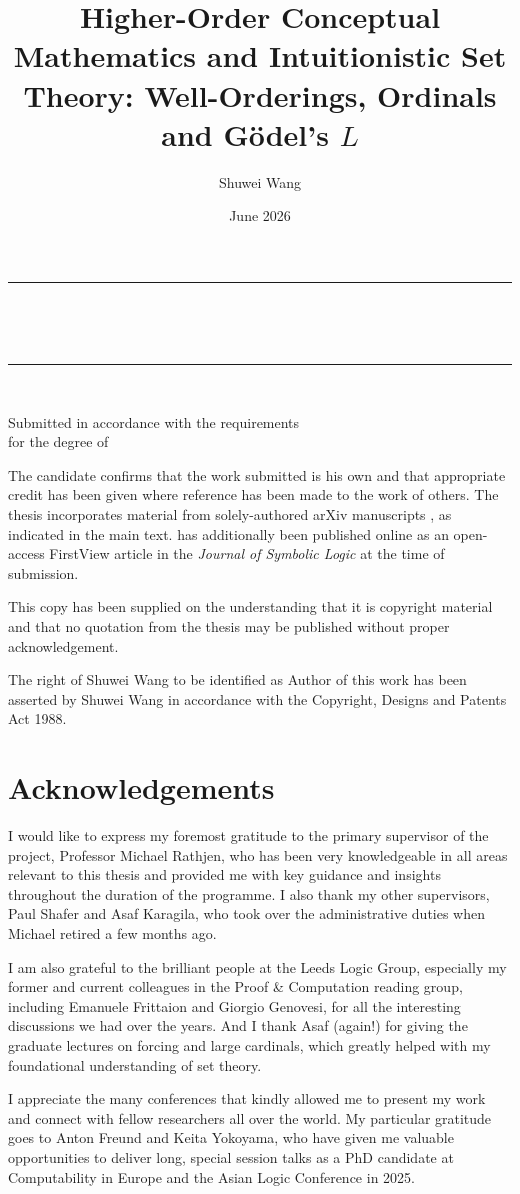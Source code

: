 \documentclass[12pt,openany]{book}
\title{Higher-Order Conceptual Mathematics and Intuitionistic Set Theory: Well-Orderings, Ordinals and G\"odel's $L$}
\author{Shuwei Wang}
\date{June 2026}
\makeatletter
\newcommand\auxitoc[1]\relax
\renewcommand\maketitle{%
  \thispagestyle{empty}
  \begin{titlepage}
    \begin{center}
      \singlespacing
      \vspace*{1cm}
      \rule\textwidth{1.5pt} \\
      {\Large \bfseries \@title \par \ }\\[-.85cm]
      \rule\textwidth{1.5pt} \\
      \vspace{1.8cm}
      {\Large \bfseries \@author \par}
      \vspace{0.5cm}
      {\Large \@university \\[.04cm]
       \large \@school \par}
      \vspace{4cm}
      {\large Submitted in accordance with the requirements \\ for the degree of \@degree \par}
      \vspace{2cm}
      {\large \bfseries \@date \par}
    \end{center}
  \end{titlepage}}
\renewcommand\auxitoc[1]{\addcontentsline{toc}{section}{\protect #1}}}
\renewcommand\auxitoc[1]{\addcontentsline{toc}{chapter}{\protect\numberline{}#1}}}
\newcommand\frontsection[1]{\clearpage\section*{\LARGE #1}\auxitoc{#1}}
\theoremstyle{plain}
\theoremstyle{definition}
\makeatother
\begin{document}
\maketitle

\thispagestyle{cover}

The candidate confirms that the work submitted is his own and that appropriate credit has been given where reference has been made to the work of others. The thesis incorporates material from solely-authored arXiv manuscripts \cites{wang-sw25-cm,wang-sw25-antichain-pre,wang-sw26-plump,wang-sw26-czf-v-l-pre}, as indicated in the main text. \cite{wang-sw25-antichain-pre} has additionally been published online as an open-access FirstView article in the \emph{Journal of Symbolic Logic} at the time of submission.

This copy has been supplied on the understanding that it is copyright material and that no quotation from the thesis may be published without proper acknowledgement.

The right of Shuwei Wang to be identified as Author of this work has been asserted by Shuwei Wang in accordance with the Copyright, Designs and Patents Act 1988.

\frontmatter

\frontsection{Acknowledgements}

I would like to express my foremost gratitude to the primary supervisor of the project, Professor Michael Rathjen, who has been very knowledgeable in all areas relevant to this thesis and provided me with key guidance and insights throughout the duration of the programme. I also thank my other supervisors, Paul Shafer and Asaf Karagila, who took over the administrative duties when Michael retired a few months ago.

I am also grateful to the brilliant people at the Leeds Logic Group, especially my former and current colleagues in the Proof \& Computation reading group, including Emanuele Frittaion and Giorgio Genovesi, for all the interesting discussions we had over the years. And I thank Asaf (again!) for giving the graduate lectures on forcing and large cardinals, which greatly helped with my foundational understanding of set theory.

I appreciate the many conferences that kindly allowed me to present my work and connect with fellow researchers all over the world. My particular gratitude goes to Anton Freund and Keita Yokoyama, who have given me valuable opportunities to deliver long, special session talks as a PhD candidate at Computability in Europe and the Asian Logic Conference in 2025.
\end{document}
